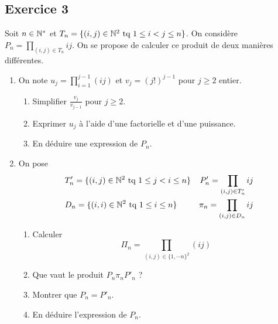 \subsection*{Exercice 3}
Soit $n\in \mathbb{N}^*$ et $T_n=\{(i,j)\in\mathbb{N}^2\text{ tq } 1\leq i < j \leq n\}$. On considère $P_n=\prod_{(i,j)\in T_n}ij$. On se propose de calculer ce produit de deux manières différentes.
\begin{enumerate}
 \item On note $u_j=\prod_{i=1}^{j-1}(ij)$ et $v_j=(j!)^{j-1}$ pour $j\geq 2$ entier.
\begin{enumerate}
 \item Simplifier $\frac{v_j}{v_{j-1}}$ pour $j\geq 2$.
 \item Exprimer $u_j$ à l'aide d'une factorielle et d'une puissance.
 \item En déduire une expression de $P_n$.
\end{enumerate}
\item On pose
\begin{align*}
 &T'_n=\{(i,j)\in\mathbb{N}^2\text{ tq } 1\leq j < i \leq n\} & P'_n = \prod_{(i,j)\in T'_n}ij\\
 &D_n=\{(i,i)\in\mathbb{N}^2\text{ tq } 1\leq i \leq n\} &  \pi_n = \prod_{(i,j)\in D_n}ij
\end{align*}

\begin{enumerate}
 \item Calculer
\begin{displaymath}
 \Pi_n = \prod_{(i,j)\in \{1,\cdots n\}^2 }(ij)
\end{displaymath}
 \item Que vaut le produit $P_n\pi_nP'_n$ ?
 \item Montrer que $P_n=P'_n$.
 \item En déduire l'expression de $P_n$.
\end{enumerate}

\end{enumerate}
